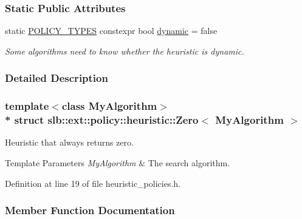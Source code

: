 \subsubsection*{Static Public Attributes}
\begin{DoxyCompactItemize}
\item 
static \hyperlink{extensions_2shared__policies_2headers_8h_ae70a06fa4631780beea14971eb36a562}{P\+O\+L\+I\+C\+Y\+\_\+\+T\+Y\+P\+ES} constexpr bool \hyperlink{structslb_1_1ext_1_1policy_1_1heuristic_1_1Zero_a61e10afc2942393c33667f580b25859c}{dynamic} = false\hypertarget{structslb_1_1ext_1_1policy_1_1heuristic_1_1Zero_a61e10afc2942393c33667f580b25859c}{}\label{structslb_1_1ext_1_1policy_1_1heuristic_1_1Zero_a61e10afc2942393c33667f580b25859c}

\begin{DoxyCompactList}\small\item\em Some algorithms need to know whether the heuristic is dynamic. \end{DoxyCompactList}\end{DoxyCompactItemize}


\subsubsection{Detailed Description}
\subsubsection*{template$<$class My\+Algorithm$>$\\*
struct slb\+::ext\+::policy\+::heuristic\+::\+Zero$<$ My\+Algorithm $>$}

Heuristic that always returns zero. 


\begin{DoxyTemplParams}{Template Parameters}
{\em My\+Algorithm} & The search algorithm. \\
\hline
\end{DoxyTemplParams}


Definition at line 19 of file heuristic\+\_\+policies.\+h.



\subsubsection{Member Function Documentation}
